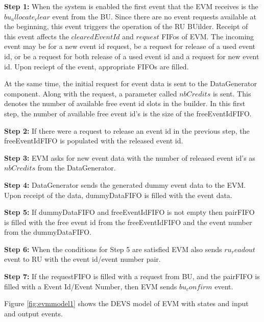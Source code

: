 \textbf{Step 1:} When the system is enabled the first event that the EVM receives is the $bu_allocate_clear$ event from the BU. Since there are no event requests available at the beginning, this event triggers the operation of the RU BUilder. Receipt of this event affects the $clearedEventId$ and $request$ FIFos of EVM. The incoming event may be for a new event id request, be a request for release of a used event id, or be a request for both release of a used event id and a request for new event id. Upon reciept of the event, appropriate FIFOs are filled.

At the same time, the initial request for event data is sent to the DataGenerator component. Along with the request, a parameter called $nbCredits$ is sent. This denotes the number of available free event id slots in the builder. In this first step, the number of available free event id's is the size of the freeEventIdFIFO. 

\textbf{Step 2:} If there were a request to release an event id in the previous step, the freeEventIdFIFO is populated with the released event id.

\textbf{Step 3:} EVM asks for new event data with the number of released event id's as $nbCredits$ from the DataGenerator.

\textbf{Step 4:} DataGenerator sends the generated dummy event data to the EVM. Upon receipt of the data, dummyDataFIFO is filled with the event data. 

\textbf{Step 5:} If dummyDataFIFO and freeEventIdFIFO is not empty then pairFIFO is filled with the free event id from the freeEventIdFIFO and the event number from the dummyDataFIFO.

\textbf{Step 6:} When the conditions for Step 5 are satisfied EVM also sends $ru_readout$ event to RU with the event id/event number pair. 

\textbf{Step 7:} If the requestFIFO is filled with a request from BU, and the pairFIFO is filled with a Event Id/Event Number, then EVM sends $bu_confirm$ event.

Figure \ref{fig:evmmodel1} shows the DEVS model of EVM with states and input and output events.

